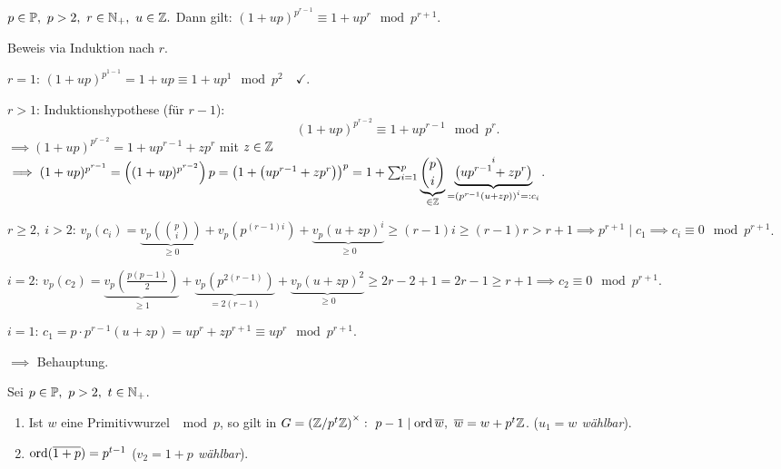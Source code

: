 \documentclass[a4paper,DIV15,BCOR12mm]{article}
\begin{document}
\begin{lemma}[$(1+p)$--Lemma]\label{lemma:1+p}
    $p\in\mathbb{P},\ p>2,\ r\in \mathbb{N}_+,\ u\in \mathbb{Z}.$ Dann gilt:
    $(1+up)^{p^{r-1}} \equiv 1+up^r \mod p^{r+1}$.
\end{lemma}
\begin{beweis}
    Beweis via Induktion nach $r$.
    \begin{description}

    \item{$r=1$:} $(1+up)^{p^{1-1}}=1+up\equiv1+up^1 \mod p^2\quad
    \checkmark$.\\
    \item{$r>1$:} Induktionshypothese (für $r-1$):
    \[
        (1+up)^{p^{r-2}}\equiv 1+ up^{r-1} \mod p^r.
    \]
    $\implies(1+up)^{p^{r-2}}=1+up^{r-1}+zp^r$ mit $z\in\mathbb{Z}$
    $\implies
    (1+up)^{p^{r-1}}=\left((1+up)^{p^{r-2}}\right)p=\left(1+\left(up^{r-1}+zp^r\right)\right)^p=1+\sum_{i=1}^p
    \underbrace{{p \choose i}}_{\in  \mathbb{Z}}
    \underbrace{\left(up^{r-1}+zp^r\right)}^i_{=\left(p^{r-1}(u+zp)\right)^i=:c_i}$.\\
    \item{$r\geq 2,\ i>2$:} $v_p(c_i)=\underbrace{v_p\left({p \choose
    i}\right)}_{\geq 0} +
    v_p\left(p^{(r-1)i}\right)+\underbrace{v_p(u+zp)^i}_{\geq 0}
    \geq (r-1)i \geq (r-1)r>r+1 \implies p^{r+1} \mid c_1 \implies
    c_i \equiv 0 \mod p^{r+1}$.
    \item{$i=2$:} $v_p(c_2)=\underbrace{v_p\left( \frac{p(p-1)}{2} \right)}_{\geq
    1} + \underbrace{v_p\left( p^{2(r-1)} \right)}_{=2(r-1)} + \underbrace{v_p(u+zp)^2}_{\geq
    0} \geq 2r-2+1=2r-1 \geq r+1 \implies c_2 \equiv 0 \mod p^{r+1}$.
    \item{$i=1$:} $c_1=p\cdot p^{r-1}(u+zp)=up^r+zp^{r+1}\equiv up^r \mod
    p^{r+1}$.
    \end{description}
    $\implies$ Behauptung.
\end{beweis}
\begin{hilfssatz}
    Sei $p\in\mathbb{P},\ p>2,\ t\in \mathbb{N}_+$.
    \begin{enumerate}
        \item Ist $w$ eine Primitivwurzel $\mod p$, so gilt in $G=\left(\mathbb{Z}/p^t
        \mathbb{Z}\right)^{\times}:\ p-1 \mid \mathop{\rm ord}\nolimits \overline w,\ \overline
        w=w+p^t \mathbb{Z}$. (\emph{$u_1=w$ wählbar}).
        \item $\mathop{\rm ord}\nolimits (\overline{1+p})=p^{t-1}$ (\emph{$v_2=1+p$
        wählbar}).
    \end{enumerate}
\end{hilfssatz}
\end{document}
